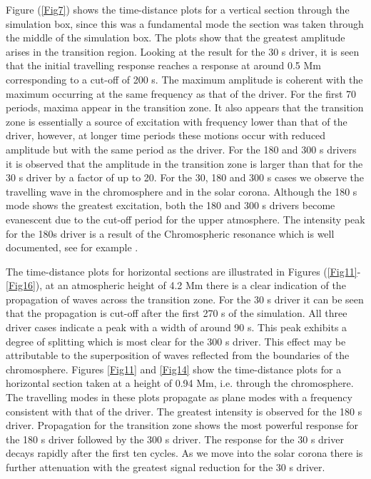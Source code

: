 \documentclass[preprint,authoryear,12pt]{elsarticle}
\begin{document}
 Figure (\ref{Fig7}) shows the time-distance plots for a vertical section through the simulation box, since this was a fundamental mode the section was taken through the middle of the simulation box. The plots show that the greatest amplitude arises in the transition region. Looking at the result for the 30 s driver, it is seen that the initial travelling response reaches a response at around 0.5 Mm corresponding to a cut-off of 200 s. The maximum amplitude is coherent with the maximum occurring at the same frequency as that of the driver. For the first 70 periods, maxima appear in the transition zone. It also appears that the transition zone is essentially a source of excitation with frequency lower than that of the driver, however, at longer time periods these motions occur with reduced amplitude but with the same period as the driver. For the 180 and 300 s drivers it is observed that the amplitude in the transition zone is larger than that for the 30 s driver by a factor of up to 20. For the 30, 180 and 300 s cases we observe the travelling wave in the chromosphere and in the solar corona. Although the 180 s mode shows the greatest excitation, both the 180 and 300 s drivers become evanescent due to the cut-off period for the upper atmosphere. The intensity peak for the 180s  driver is a result of the Chromospheric resonance which is well documented, see for example \citet{Fleck1991}. 

The time-distance plots for horizontal sections are illustrated in Figures (\ref{Fig11}-\ref{Fig16}), at an atmospheric height of 4.2 Mm there is a clear indication of the propagation of waves across the transition zone. For the 30 s driver it can be seen that  the propagation is cut-off after the first 270 s of the simulation. All three driver cases indicate a peak with a width of around 90 s. This peak exhibits a degree of splitting which is most clear for the 300 s driver.  This effect may be attributable to the superposition of waves reflected from the boundaries of the chromosphere. Figures \ref{Fig11} and \ref{Fig14} show the time-distance plots for a horizontal section taken at a height of 0.94 Mm, i.e. through the chromosphere. The travelling modes in these plots propagate as plane modes with a frequency consistent with that of the driver. The greatest intensity is observed for the 180 s driver. Propagation for the transition zone shows the most powerful response for the 180 s driver followed by the 300 s driver. The response for the 30 s driver decays rapidly after the first ten cycles. As we move into the solar corona there is further attenuation with the greatest signal reduction for the 30 s driver.
\end{document}
